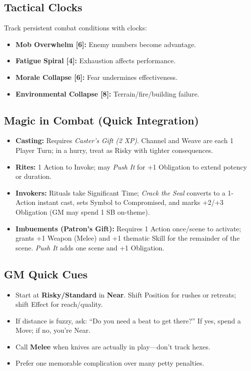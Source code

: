 \subsection{Tactical Clocks}
Track persistent combat conditions with clocks:
\begin{itemize}
  \item \textbf{Mob Overwhelm [6]:} Enemy numbers become advantage.
  \item \textbf{Fatigue Spiral [4]:} Exhaustion affects performance.
  \item \textbf{Morale Collapse [6]:} Fear undermines effectiveness.
  \item \textbf{Environmental Collapse [8]:} Terrain/fire/building failure.
\end{itemize}

\subsection{Magic in Combat (Quick Integration)}
\begin{itemize}
  \item \textbf{Casting:} Requires \emph{Caster’s Gift (2 XP)}. Channel and Weave are each 1 Player Turn; in a hurry, treat as Risky with tighter consequences.
  \item \textbf{Rites:} 1 Action to Invoke; may \emph{Push It} for +1 Obligation to extend potency or duration.
  \item \textbf{Invokers:} Rituals take Significant Time; \emph{Crack the Seal} converts to a 1-Action instant cast, sets Symbol to Compromised, and marks +2/+3 Obligation (GM may spend 1 SB on-theme).
  \item \textbf{Imbuements (Patron’s Gift):} Requires 1 Action once/scene to activate; grants +1 Weapon (Melee) and +1 thematic Skill for the remainder of the scene. \emph{Push It} adds one scene and +1 Obligation.
\end{itemize}

\subsection{GM Quick Cues}
\begin{itemize}
  \item Start at \textbf{Risky/Standard} in \textbf{Near}. Shift Position for rushes or retreats; shift Effect for reach/quality.
  \item If distance is fuzzy, ask: ``Do you need a beat to get there?'' If yes, spend a Move; if no, you’re Near.
  \item Call \textbf{Melee} when knives are actually in play—don’t track hexes.
  \item Prefer one memorable complication over many petty penalties.
\end{itemize}

